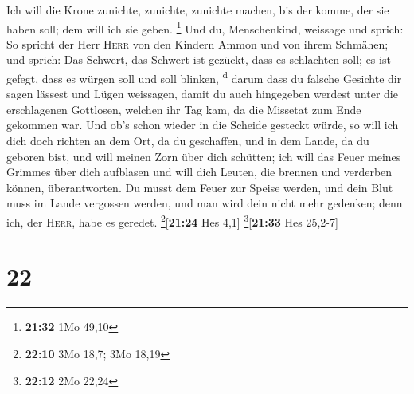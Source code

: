  Ich will die Krone zunichte, zunichte, zunichte machen,
bis der komme, der sie haben soll; dem will ich sie geben. \footnote{\textbf{21:32}
  1Mo 49,10}  Und du, Menschenkind, weissage und sprich:
So spricht der Herr \textsc{Herr} von den Kindern Ammon und von ihrem
Schmähen; und sprich: Das Schwert, das Schwert ist gezückt, dass es
schlachten soll; es ist gefegt, dass es würgen soll und soll blinken,
\textsuperscript{d}  darum dass du falsche Gesichte dir
sagen lässest und Lügen weissagen, damit du auch hingegeben werdest
unter die erschlagenen Gottlosen, welchen ihr Tag kam, da die Missetat
zum Ende gekommen war.  Und ob's schon wieder in die
Scheide gesteckt würde, so will ich dich doch richten an dem Ort, da du
geschaffen, und in dem Lande, da du geboren bist,  und
will meinen Zorn über dich schütten; ich will das Feuer meines Grimmes
über dich aufblasen und will dich Leuten, die brennen und verderben
können, überantworten.  Du musst dem Feuer zur Speise
werden, und dein Blut muss im Lande vergossen werden, und man wird dein
nicht mehr gedenken; denn ich, der \textsc{Herr}, habe es geredet.
\footnote{\textbf{22:10} 3Mo 18,7; 3Mo 18,19}{[}\textbf{21:24} Hes
4,1{]} \footnote{\textbf{22:12} 2Mo 22,24}{[}\textbf{21:33} Hes
25,2-7{]}

\hypertarget{section-21}{%
\section{22}\label{section-21}}

